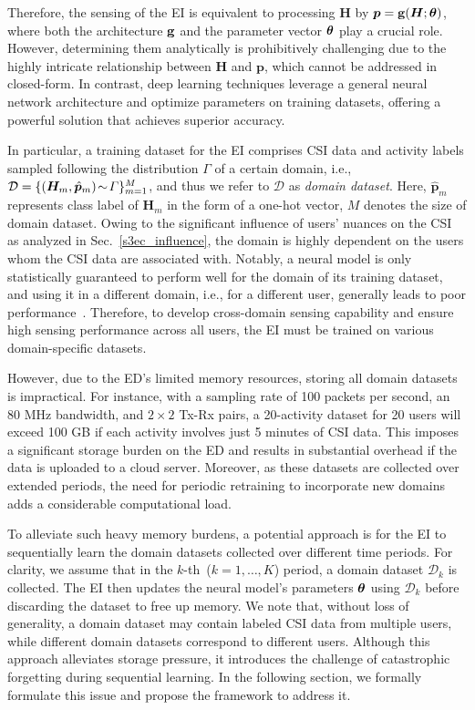 Therefore, the sensing of the EI is equivalent to processing $\bm H$ by $\bm p = \mathbf{g}(\bm H; \bm \theta)$, where both the architecture $\mathbf{g}$ and the parameter vector $\bm\theta$ play a crucial role.
However, determining them analytically is prohibitively challenging due to the highly intricate relationship between $\bm H$ and $\bm p$, which cannot be addressed in closed-form. 
In contrast, deep learning techniques leverage a general neural network architecture and optimize parameters on training datasets, offering a powerful solution that achieves superior accuracy.

In particular, a training dataset for the EI comprises CSI data and activity labels sampled following the distribution $\varGamma$ of a certain domain, i.e., $\mathcal D=\{ (\bm H_m, \hat{\bm p}_m)\!\sim\! \varGamma\}_{m=1}^M$, and thus we refer to $\mathcal D$ as \emph{domain dataset}.
Here, $\hat{\bm p}_m$ represents class label of $\bm H_m$ in the form of a one-hot vector, $M$ denotes the size of domain dataset.
Owing to the significant influence of users' nuances on the CSI as analyzed in Sec.~\ref{s3ec_influence}, the domain is highly dependent on the users whom the CSI data are associated with.
Notably, a neural model is only statistically guaranteed to perform well for the domain of its training dataset, and using it in a different domain, i.e., for a different user, generally leads to poor performance~\cite{goodfellow2016deep}.
Therefore, to develop cross-domain sensing capability and ensure high sensing performance across all users, the EI must be trained on various domain-specific datasets.


However, due to the ED's limited memory resources, storing all domain datasets is impractical. 
For instance, with a sampling rate of 100 packets per second, an 80 MHz bandwidth, and $2 \times 2$ Tx-Rx pairs, a 20-activity dataset for 20 users will exceed 100 GB if each activity involves just 5 minutes of CSI data. 
This imposes a significant storage burden on the ED and results in substantial overhead if the data is uploaded to a cloud server. 
Moreover, as these datasets are collected over extended periods, the need for periodic retraining to incorporate new domains adds a considerable computational load.


To alleviate such heavy memory burdens, a potential approach is for the EI to sequentially learn the domain datasets collected over different time periods. 
For clarity, we assume that in the $k$-th~($k=1,\dots,K$) period, a domain dataset $\mathcal{D}_k$ is collected. 
The EI then updates the neural model's parameters $\bm\theta$ using $\mathcal{D}_k$ before discarding the dataset to free up memory. 
We note that, without loss of generality, a domain dataset may contain labeled CSI data from multiple users, while different domain datasets correspond to different users.
Although this approach alleviates storage pressure, it introduces the challenge of catastrophic forgetting during sequential learning. 
In the following section, we formally formulate this issue and propose the \name framework to address it.




\endinput